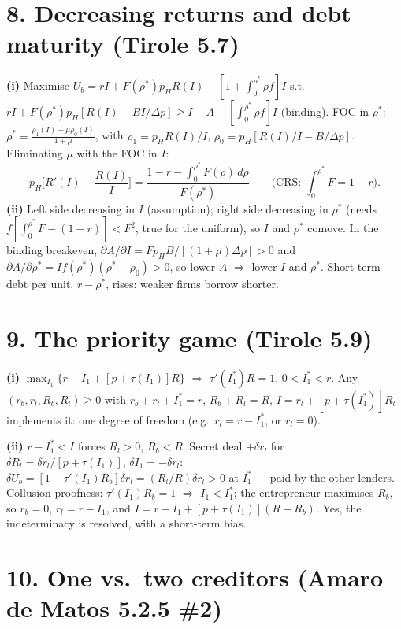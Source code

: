\documentclass[11pt,a4paper]{article}
\begin{document}
\section*{8. Decreasing returns and debt maturity (Tirole 5.7)}

\textbf{(i)} Maximise $U_b=rI+F(\rho^*)p_HR(I)-[1+\int_0^{\rho^*}\rho f]I$ s.t.\ $rI+F(\rho^*)p_H[R(I)-BI/\Delta p]\ge I-A+[\int_0^{\rho^*}\rho f]I$ (binding).
FOC in $\rho^*$: $\rho^*=\frac{\rho_1(I)+\mu\rho_0(I)}{1+\mu}$, with $\rho_1=p_HR(I)/I$, $\rho_0=p_H[R(I)/I-B/\Delta p]$. Eliminating $\mu$ with the FOC in $I$:
$$p_H\Big[R'(I)-\frac{R(I)}{I}\Big]=\frac{1-r-\int_0^{\rho^*}F(\rho)\,d\rho}{F(\rho^*)}\qquad\big(\text{CRS: }\textstyle\int_0^{\rho^*}F=1-r\big).$$
\textbf{(ii)} Left side decreasing in $I$ (assumption); right side decreasing in $\rho^*$ (needs $f[\int_0^{\rho^*}F-(1-r)]<F^2$, true for the uniform), so $I$ and $\rho^*$ comove.
In the binding breakeven, $\partial A/\partial I=F p_HB/[(1+\mu)\Delta p]>0$ and $\partial A/\partial\rho^*=If(\rho^*)(\rho^*-\rho_0)>0$, so lower $A$ $\Rightarrow$ lower $I$ and $\rho^*$.
Short-term debt per unit, $r-\rho^*$, rises: weaker firms borrow shorter.

\section*{9. The priority game (Tirole 5.9)}

\textbf{(i)} $\max_{I_1}\{r-I_1+[p+\tau(I_1)]R\}$ $\Rightarrow$ $\tau'(I_1^*)R=1$, $0<I_1^*<r$. Any $(r_b,r_l,R_b,R_l)\ge0$ with $r_b+r_l+I_1^*=r$, $R_b+R_l=R$,
$I=r_l+[p+\tau(I_1^*)]R_l$ implements it: one degree of freedom (e.g.\ $r_l=r-I_1^*$, or $r_l=0$).

\textbf{(ii)} $r-I_1^*<I$ forces $R_l>0$, $R_b<R$. Secret deal $+\delta r_l$ for $\delta R_l=\delta r_l/[p+\tau(I_1)]$, $\delta I_1=-\delta r_l$:
$\delta U_b=[1-\tau'(I_1)R_b]\delta r_l=(R_l/R)\delta r_l>0$ at $I_1^*$ --- paid by the other lenders.
Collusion-proofness: $\tau'(I_1)R_b=1$ $\Rightarrow$ $I_1<I_1^*$; the entrepreneur maximises $R_b$, so $r_b=0$, $r_l=r-I_1$, and $I=r-I_1+[p+\tau(I_1)](R-R_b)$.
Yes, the indeterminacy is resolved, with a short-term bias.

\section*{10. One vs.\ two creditors (Amaro de Matos 5.2.5 \#2)}
\end{document}
